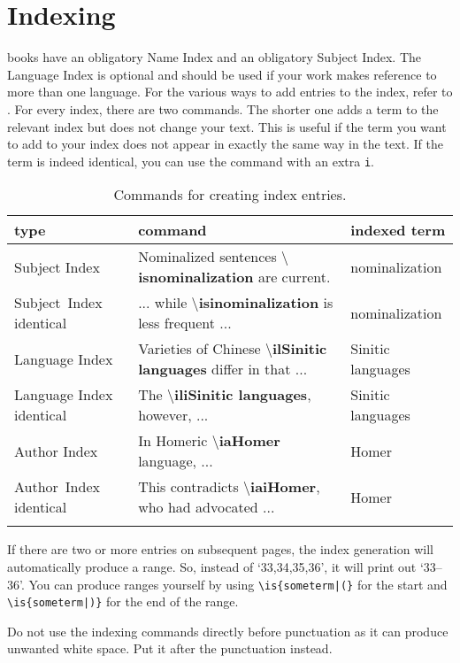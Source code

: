 \chapter{Indexing}
\lsp books have an obligatory Name Index and an obligatory Subject Index. The Language Index is optional and should be used if your work makes reference to more than one language. 
For the various ways to add entries to the index, refer to . For every index, there are two commands. The shorter one adds a term to the relevant index but does not change your text. This is useful if the term you want to add to your index does not appear in exactly the same way in the text. If the term is indeed identical, you can use the command with an extra \verb+i+.

\begin{table}[h]
\caption{Commands for creating index entries.}
\label{tab:latex:indexentriese}
 \begin{tabular}{p{2.5cm}>{\tt\small\raggedright}p{6.5cm}l}
  \lsptoprule
  type & \rm\normalsize command & indexed term \\
  \midrule
  Subject Index& Nominalized sentences \textbf{$\setminus$is{nominalization}} are current. & nomina\-lization \\
  \mbox{Subject Index} identical& ... while \textbf{$\setminus$isi{nominalization}} is less frequent ...  & nomina\-lization \\[2em]
  Language Index & Varieties of Chinese \textbf{$\setminus$il{Sinitic languages}} differ in that ...& Sinitic languages \\
  Language Index identical& The \textbf{$\setminus$ili{Sinitic languages}}, \mbox{however}, ... & Sinitic languages \\[2em]
  Author Index & In Homeric \textbf{$\setminus$ia{Homer}} language, ...  & Homer\\
  \mbox{Author Index} identical & This contradicts \textbf{$\setminus$iai{Homer}}, who had advocated ... & Homer \\
  \lspbottomrule
 \end{tabular}
\end{table}

If there are two or more entries on subsequent pages, the index generation will automatically produce a range. So, instead of `33,34,35,36', it will print out `33--36'. You can produce ranges yourself by using \verb+\is{someterm|(}+ for the start and  \verb+\is{someterm|)}+ for the end of the range. 

Do not use the indexing commands directly before punctuation as it can produce unwanted white space. Put it after the punctuation instead.

